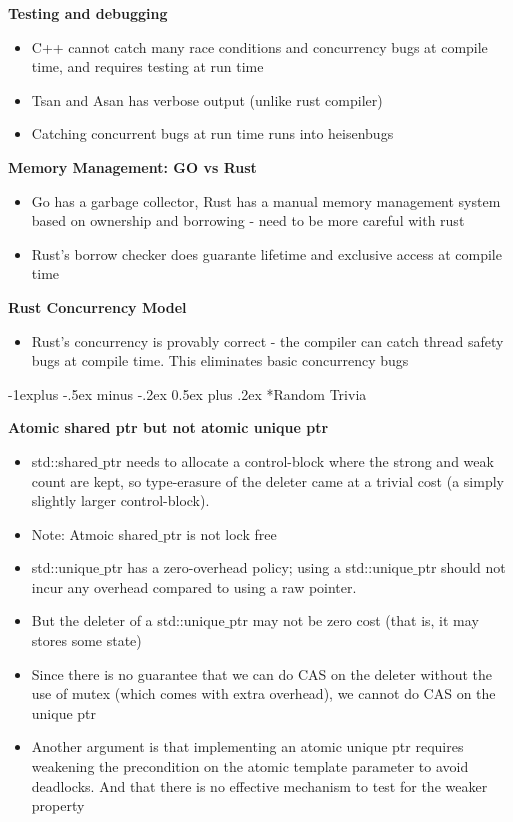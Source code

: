 \documentclass[10pt, landscape]{article}
\makeatletter
\renewcommand{\subsection}{\@startsection{subsection}{2}{0mm}%
                                {-1explus -.5ex minus -.2ex}%
                                {0.5ex plus .2ex}%
                                {\normalfont\normalsize\bfseries}}
\makeatother
\begin{document}
\begin{multicols}{4}
\textbf{Testing and debugging} \\
\begin{itemize}
    \item C++ cannot catch many race conditions and concurrency bugs at compile time, and requires testing at run time 
    \item Tsan and Asan has verbose output (unlike rust compiler)
    \item Catching concurrent bugs at run time runs into heisenbugs
\end{itemize}

\textbf{Memory Management: GO vs Rust} \\
\begin{itemize}
    \item Go has a garbage collector, Rust has a manual memory management system based on ownership and borrowing - need to be more careful with rust 
    \item Rust's borrow checker does guarante lifetime and exclusive access at compile time
\end{itemize}

\textbf{Rust Concurrency Model} \\
\begin{itemize}
    \item Rust's concurrency is provably correct - the compiler can catch thread safety bugs at compile time. This eliminates basic concurrency bugs
\end{itemize}

\subsection*{Random Trivia}

\textbf{Atomic shared ptr but not atomic unique ptr} \\
\begin{itemize}
    \item std::shared$\_$ptr needs to allocate a control-block where the strong and weak count are kept, so type-erasure of the deleter came at a trivial cost (a simply slightly larger control-block).
    \item Note: Atmoic shared$\_$ptr is not lock free
    \item std::unique$\_$ptr has a zero-overhead policy; using a std::unique$\_$ptr should not incur any overhead compared to using a raw pointer.
    \item But the deleter of a std::unique$\_$ptr may not be zero cost (that is, it may stores some state)
    \item Since there is no guarantee that we can do CAS on the deleter without the use of mutex (which comes with extra overhead), we cannot do CAS on the unique ptr
    \item Another argument is that implementing an atomic unique ptr requires weakening the precondition on the atomic template parameter to avoid deadlocks. And that there is no effective mechanism to test for the weaker property
\end{itemize}

\end{multicols}
\end{document}
